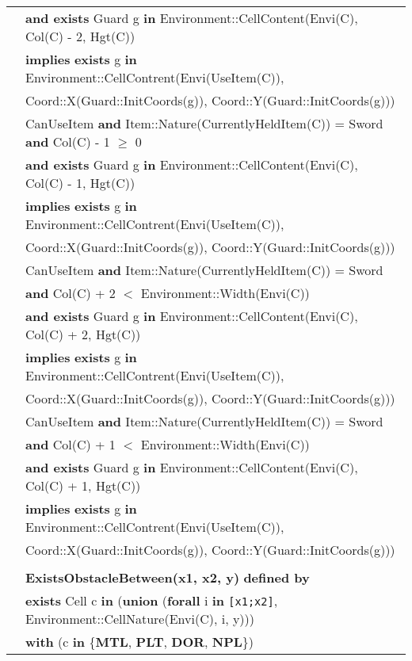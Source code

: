 \documentclass[7pt]{article}
\begin{document}
\begin{tabular}{rl}
& \quad \textbf{and exists} Guard g \textbf{in} Environment::CellContent(Envi(C), Col(C) - 2, Hgt(C)) \\
& \quad \textbf{implies} \textbf{exists} g \textbf{in} Environment::CellContrent(Envi(UseItem(C)), \\
& \quad\quad\quad Coord::X(Guard::InitCoords(g)), Coord::Y(Guard::InitCoords(g))) \\
& CanUseItem \textbf{and} Item::Nature(CurrentlyHeldItem(C)) = Sword \textbf{and} Col(C) - 1 $\geq$  0 \\
& \quad \textbf{and exists} Guard g \textbf{in} Environment::CellContent(Envi(C), Col(C) - 1, Hgt(C)) \\
& \quad \textbf{implies} \textbf{exists} g \textbf{in} Environment::CellContrent(Envi(UseItem(C)), \\
& \quad\quad\quad Coord::X(Guard::InitCoords(g)), Coord::Y(Guard::InitCoords(g))) \\
& CanUseItem \textbf{and} Item::Nature(CurrentlyHeldItem(C)) = Sword \\
& \quad \textbf{and} Col(C) + 2 $<$ Environment::Width(Envi(C))\\
 & \quad \textbf{and exists} Guard g \textbf{in} Environment::CellContent(Envi(C), Col(C) + 2, Hgt(C)) \\
& \quad \textbf{implies} \textbf{exists} g \textbf{in} Environment::CellContrent(Envi(UseItem(C)), \\
& \quad\quad\quad Coord::X(Guard::InitCoords(g)), Coord::Y(Guard::InitCoords(g))) \\
& CanUseItem \textbf{and} Item::Nature(CurrentlyHeldItem(C)) = Sword \\
& \quad \textbf{and} Col(C) + 1 $<$ Environment::Width(Envi(C)) \\
& \quad \textbf{and exists} Guard g \textbf{in} Environment::CellContent(Envi(C), Col(C) + 1, Hgt(C)) \\
& \quad \textbf{implies} \textbf{exists} g \textbf{in} Environment::CellContrent(Envi(UseItem(C)), \\
& \quad\quad\quad Coord::X(Guard::InitCoords(g)), Coord::Y(Guard::InitCoords(g))) \\ \\
& \textbf{ExistsObstacleBetween(x1, x2, y)} \textbf{defined by} \\ 
&\quad\quad \textbf{exists} Cell c \textbf{in} (\textbf{union} (\textbf{forall} i \textbf{in} \texttt{[x1;x2]}, Environment::CellNature(Envi(C), i, y))) \\
&\quad\quad \textbf{with} (c \textbf{in} \{\textbf{MTL}, \textbf{PLT}, \textbf{DOR}, \textbf{NPL}\}) \\

\end{tabular}
\end{document}
